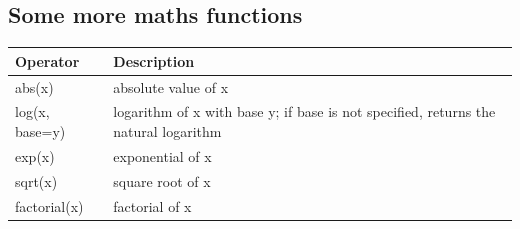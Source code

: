 \documentclass[]{book}
\begin{document}
\hypertarget{some-more-maths-functions}{%
\subsection{Some more maths functions}\label{some-more-maths-functions}}

\begin{longtable}[]{@{}ll@{}}
\toprule
\begin{minipage}[b]{0.47\columnwidth}\raggedright
Operator\strut
\end{minipage} & \begin{minipage}[b]{0.47\columnwidth}\raggedright
Description\strut
\end{minipage}\tabularnewline
\midrule
\endhead
\begin{minipage}[t]{0.47\columnwidth}\raggedright
abs(x)\strut
\end{minipage} & \begin{minipage}[t]{0.47\columnwidth}\raggedright
absolute value of x\strut
\end{minipage}\tabularnewline
\begin{minipage}[t]{0.47\columnwidth}\raggedright
log(x, base=y)\strut
\end{minipage} & \begin{minipage}[t]{0.47\columnwidth}\raggedright
logarithm of x with base y; if base is not specified, returns the natural logarithm\strut
\end{minipage}\tabularnewline
\begin{minipage}[t]{0.47\columnwidth}\raggedright
exp(x)\strut
\end{minipage} & \begin{minipage}[t]{0.47\columnwidth}\raggedright
exponential of x\strut
\end{minipage}\tabularnewline
\begin{minipage}[t]{0.47\columnwidth}\raggedright
sqrt(x)\strut
\end{minipage} & \begin{minipage}[t]{0.47\columnwidth}\raggedright
square root of x\strut
\end{minipage}\tabularnewline
\begin{minipage}[t]{0.47\columnwidth}\raggedright
factorial(x)\strut
\end{minipage} & \begin{minipage}[t]{0.47\columnwidth}\raggedright
factorial of x\strut
\end{minipage}\tabularnewline
\bottomrule
\end{longtable}
\end{document}
